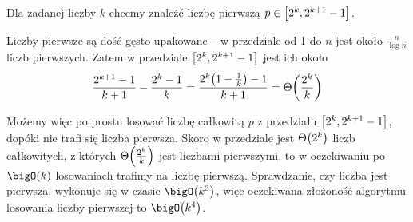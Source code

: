 Dla zadanej liczby \( k \) chcemy znaleźć liczbę pierwszą \( p \in \left[2^k, 2^{k+1}-1\right] \).

Liczby pierwsze są dość gęsto upakowane -- w przedziale od 1 do \( n \) jest około \( \frac{n}{\log n} \) liczb pierwszych.
Zatem w przedziale \( \left[2^k, 2^{k+1}-1\right] \) jest ich około
\[
    \frac{2^{k+1} - 1}{k+1} - \frac{2^{k} - 1}{k} = \frac{2^k\pars{1-\frac{1}{k}} - 1}{k+1} = \Theta\pars{\frac{2^k}{k}}
\]

Możemy więc po prostu losować liczbę całkowitą \( p \) z przedziału \( \left[2^k, 2^{k+1}-1\right] \), dopóki nie trafi się liczba pierwsza.
Skoro w przedziale jest \( \Theta\pars{2^k} \) liczb całkowitych, z których \( \Theta\pars{\frac{2^k}{k}} \) jest liczbami pierwszymi, to w oczekiwaniu po \( \bigO(k) \) losowaniach trafimy na liczbę pierwszą.
Sprawdzanie, czy liczba jest pierwsza, wykonuje się w czasie \( \bigO\pars{k^3} \), więc oczekiwana złożoność algorytmu losowania liczby pierwszej to \( \bigO\pars{k^4} \).